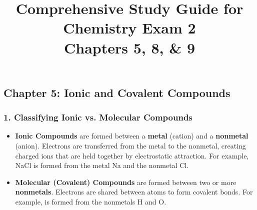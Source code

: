 \documentclass{article}
\begin{document}
\title{\textbf{Comprehensive Study Guide for Chemistry Exam 2 \\ Chapters 5, 8, \& 9}}
\date{} %
\maketitle

\subsection*{Chapter 5: Ionic and Covalent Compounds}

\subsubsection*{1. Classifying Ionic vs. Molecular Compounds}
\begin{itemize}[itemsep=5pt]
    \item \textbf{Ionic Compounds} are formed between a \textbf{metal} (cation) and a \textbf{nonmetal} (anion). Electrons are transferred from the metal to the nonmetal, creating charged ions that are held together by electrostatic attraction. For example, NaCl is formed from the metal Na and the nonmetal Cl.
    \item \textbf{Molecular (Covalent) Compounds} are formed between two or more \textbf{nonmetals}. Electrons are shared between atoms to form covalent bonds. For example,  is formed from the nonmetals H and O.
\end{itemize}
\end{document}
